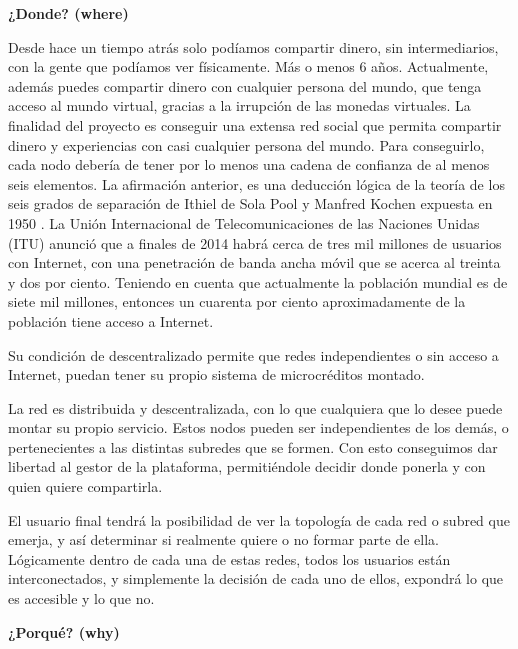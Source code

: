\documentclass[a4paper, 12pt]{book}
\begin{document}
\textbf{¿Donde? (where)}

Desde hace un tiempo atrás solo podíamos compartir dinero, sin intermediarios, 
con la gente que podíamos ver físicamente. Más o menos 6 años. Actualmente, 
además puedes compartir dinero con cualquier persona del mundo, que tenga 
acceso al mundo virtual, gracias a la irrupción de las monedas virtuales. La 
finalidad del proyecto es conseguir una extensa red social que permita 
compartir dinero y experiencias con casi cualquier persona del mundo. Para 
conseguirlo, cada nodo debería de tener por lo menos una cadena de confianza de 
al menos seis elementos. La afirmación anterior, es una deducción lógica de la 
teoría de los seis grados de separación de Ithiel de Sola Pool y Manfred Kochen 
expuesta en 1950 \cite{ithiel_1950}. La Unión Internacional de 
Telecomunicaciones de las Naciones Unidas (ITU) anunció que a finales de 2014 
habrá cerca de tres mil millones de usuarios con Internet, con una penetración 
de banda ancha móvil que se acerca al treinta y dos por ciento. Teniendo en 
cuenta que actualmente la población mundial es de siete mil millones, entonces 
un cuarenta por ciento aproximadamente de la población tiene acceso a Internet.

Su condición de descentralizado permite que redes independientes o sin acceso
a Internet, puedan tener su propio sistema de microcréditos montado.

La red es distribuida y descentralizada, con lo que cualquiera que lo desee 
puede montar su propio servicio. Estos nodos pueden ser independientes de los 
demás, o pertenecientes a las distintas subredes que se formen. Con esto 
conseguimos dar libertad al gestor de la plataforma, permitiéndole decidir 
donde ponerla y con quien quiere compartirla.

El usuario final tendrá la posibilidad de ver la topología de cada red o subred 
que emerja, y así determinar si realmente quiere o no formar parte de ella. 
Lógicamente dentro de cada una de estas redes, todos los usuarios están 
interconectados, y simplemente la decisión de cada uno de ellos, expondrá lo 
que es accesible y lo que no.

\textbf{¿Porqué? (why)}
\end{document}
